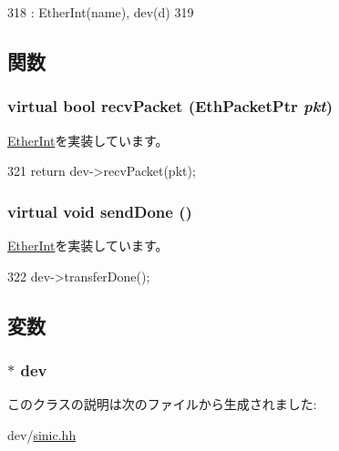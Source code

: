 \begin{DoxyCode}
318         : EtherInt(name), dev(d)
319     { }
\end{DoxyCode}


\subsection{関数}
\hypertarget{classSinic_1_1Interface_a9bd96a108d6f58f140c9f7d83726eebe}{
\subsubsection[{recvPacket}]{\setlength{\rightskip}{0pt plus 5cm}virtual bool recvPacket ({\bf EthPacketPtr} {\em pkt})}}
\label{classSinic_1_1Interface_a9bd96a108d6f58f140c9f7d83726eebe}


\hyperlink{classEtherInt_af3076ea966a2abda7735ea65e8a02034}{EtherInt}を実装しています。


\begin{DoxyCode}
321 { return dev->recvPacket(pkt); }
\end{DoxyCode}
\hypertarget{classSinic_1_1Interface_a967489e0b2900f4b12d99e6257d24dbe}{
\subsubsection[{sendDone}]{\setlength{\rightskip}{0pt plus 5cm}virtual void sendDone ()}}
\label{classSinic_1_1Interface_a967489e0b2900f4b12d99e6257d24dbe}


\hyperlink{classEtherInt_a5a2f0c04ee61250a128bc992d2118390}{EtherInt}を実装しています。


\begin{DoxyCode}
322 { dev->transferDone(); }
\end{DoxyCode}


\subsection{変数}
\hypertarget{classSinic_1_1Interface_a4b03696f02d977bb09c0ed16cd40aba0}{
\subsubsection[{dev}]{$\ast$ {\bf dev}}}
\label{classSinic_1_1Interface_a4b03696f02d977bb09c0ed16cd40aba0}


このクラスの説明は次のファイルから生成されました:\begin{DoxyCompactItemize}
\item 
dev/\hyperlink{sinic_8hh}{sinic.hh}\end{DoxyCompactItemize}
